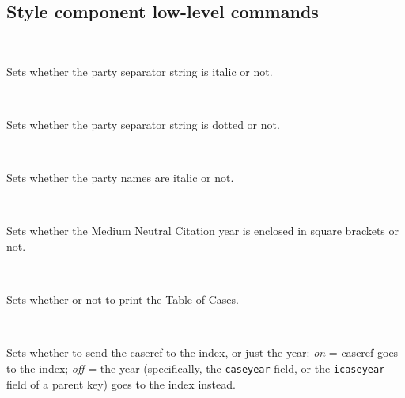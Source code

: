 \subsection{Style component low-level commands}




 \\

Sets whether the party separator string is italic or not.
\bigskip
	

 \\

Sets whether the party separator string is dotted or not.
\bigskip
	


 \\

Sets whether the party names are italic or not.
\bigskip
	




 \\

Sets whether the Medium Neutral Citation year is enclosed in square brackets or not.
\bigskip
	


 \\

Sets whether or not to print the Table of Cases.
\bigskip
	


 \\

Sets whether to send the caseref to the index, or just the year: \textit{on} = caseref goes to the index; \textit{off} = the year (specifically, the \texttt{caseyear} field, or the \texttt{icaseyear} field of a parent key) goes to the index instead.
\bigskip
	


 \\
 \\
 \\

